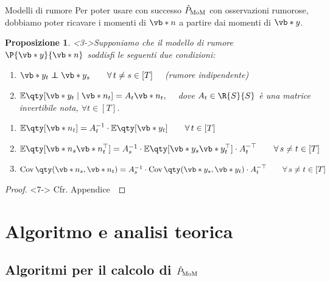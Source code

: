 \documentclass[10pt,xcolor={table,dvipsnames}]{beamer} 		%
\theoremstyle{plain}					%
\newtheorem{proposizione}{Proposizione}%
\theoremstyle{definition}
\theoremstyle{remark}
\newcommand{\transpose}[1]{#1^{\top}}
\newcommand{\Cov}[1]{\operatorname{Cov}\qty(#1)}
\newcommand\independent{\protect\mathpalette{\protect\independenT}{\perp}}
\def\independenT#1#2{\mathrel{\rlap{$#1#2$}\mkern2mu{#1#2}}}
\begin{document}
	\begin{frame}
		{\hypertarget{frame:prop_noise_model}{Modelli di rumore}}
		Per poter usare con successo $\hat{P}_{\textup{MoM}}$ con osservazioni rumorose,
		dobbiamo poter ricavare i momenti di $\vb*{n}$ a partire dai momenti di $\vb*{y}$.

		
		\begin{proposizione}<3->\label{prop:noise_model}
			Supponiamo che il modello di rumore $\P{\vb*{y}}{\vb*{n}}$ soddisfi le seguenti
			due condizioni:
			\begin{enumerate}
				\item<3-> $\vb*{y}_t\independent\vb*{y}_s\qquad\forall\,t\ne s\in[T]\quad$ {\smaller (rumore indipendente)}
				\item<4-> $\mathbb{E}\qty[\vb*{y}_t\mid\vb*{n}_t]=A_t\vb*{n}_t,\quad$ dove $A_t\in\R{S}{S}$ è una 
				matrice \emph{invertibile} nota, $\forall t\in[T]$.
			\end{enumerate}
			\begin{enumerate}
				\item<6-> $\mathbb{E}\qty[\vb*{n}_t]=A_t^{-1}\cdot\mathbb{E}\qty[\vb*{y}_t]\qquad\forall\,t\in[T]$
				\item<6-> $\mathbb{E}\qty[\vb*{n}_s\transpose{\vb*{n}_t}]=A_s^{-1}\cdot\mathbb{E}\qty[\vb*{y}_s\transpose{\vb*{y}_t}]\cdot{A_t^{-\top}}\qquad\forall\,s\ne t\in[T]$
				\item<6-> $\Cov{\vb*{n}_s,\vb*{n}_t}=A_s^{-1}\cdot\Cov{\vb*{y}_s,\vb*{y}_t}\cdot{A_t^{-\top}}\qquad\forall\,s\ne t\in[T]$
			\end{enumerate}
		\end{proposizione}
		\begin{proof}<7->
			Cfr. Appendice~\hyperlink{frame:dim_prop_noise_model:appendice}{\faHandPointRight}
		\end{proof}
	\end{frame}



\section{Algoritmo e analisi teorica}
    \subsection{Algoritmi per il calcolo di \texorpdfstring{$\hat{P}_{\textup{MoM}}$}{P}}
\end{document}
